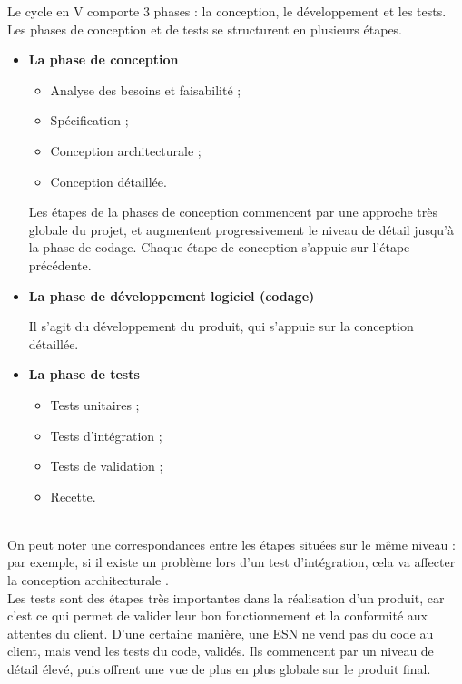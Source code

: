 Le cycle en V comporte 3 phases : la conception, le développement et les tests. Les phases de conception et de tests se structurent en plusieurs étapes.\\


\begin{itemize}
\item \textbf{La phase de conception}

\begin{itemize}
\item Analyse des besoins et faisabilité ;
\item Spécification ;
\item Conception architecturale ;
\item Conception détaillée.
\end{itemize}

Les étapes de la phases de conception commencent par une approche très globale du projet, et augmentent progressivement le niveau de détail jusqu'à la phase de codage. Chaque étape de conception s'appuie sur l'étape précédente. \\

\item \textbf{La phase de développement logiciel (codage)}

Il s'agit du développement du produit, qui s'appuie sur la conception détaillée. \\

\item \textbf{La phase de tests}

\begin{itemize}
\item Tests unitaires ;
\item Tests d'intégration ;
\item Tests de validation ;
\item Recette.
\end{itemize}

\end{itemize}
~\\
On peut noter une correspondances entre les étapes situées sur le même niveau : par exemple, si il existe un problème lors d'un test d'intégration, cela va affecter la conception architecturale . \\

Les tests sont des étapes très importantes dans la réalisation d'un produit, car c'est ce qui permet de valider leur bon fonctionnement et la conformité aux attentes du client. D'une certaine manière, une ESN ne vend pas du code au client, mais vend les tests du code, validés. Ils commencent par un niveau de détail élevé, puis offrent une vue de plus en plus globale sur le produit final.\\


